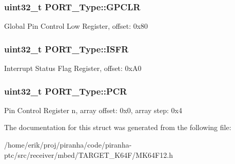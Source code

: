 \subsubsection[{\texorpdfstring{G\+P\+C\+LR}{GPCLR}}]{ uint32\+\_\+t P\+O\+R\+T\+\_\+\+Type\+::\+G\+P\+C\+LR}\hypertarget{structPORT__Type_ab4eae4ee06e554db6797dbbcf67f9655}{}\label{structPORT__Type_ab4eae4ee06e554db6797dbbcf67f9655}
Global Pin Control Low Register, offset\+: 0x80 
\subsubsection[{\texorpdfstring{I\+S\+FR}{ISFR}}]{ uint32\+\_\+t P\+O\+R\+T\+\_\+\+Type\+::\+I\+S\+FR}\hypertarget{structPORT__Type_a20069f4ac88fc12066ba90eea8fcbb58}{}\label{structPORT__Type_a20069f4ac88fc12066ba90eea8fcbb58}
Interrupt Status Flag Register, offset\+: 0x\+A0 
\subsubsection[{\texorpdfstring{P\+CR}{PCR}}]{ uint32\+\_\+t P\+O\+R\+T\+\_\+\+Type\+::\+P\+CR}\hypertarget{structPORT__Type_ab03f2583d716b3619bfddb05060a0d72}{}\label{structPORT__Type_ab03f2583d716b3619bfddb05060a0d72}
Pin Control Register n, array offset\+: 0x0, array step\+: 0x4 

The documentation for this struct was generated from the following file\+:\begin{DoxyCompactItemize}
\item 
/home/erik/proj/piranha/code/piranha-\/ptc/src/receiver/mbed/\+T\+A\+R\+G\+E\+T\+\_\+\+K64\+F/M\+K64\+F12.\+h\end{DoxyCompactItemize}
